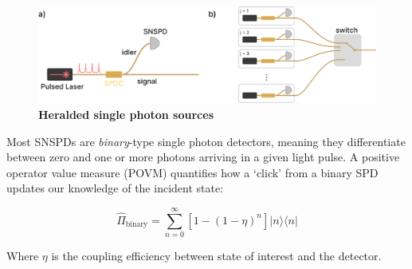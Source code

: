 \documentclass[12pt]{caltech_thesis}
\begin{document}
\hypertarget{fig:hsps}{%
\begin{figure}
\centering
\includegraphics{chapter_05/figs_05/hsps_light.pdf}
\caption[{Heralded single photon source designs}]{\textbf{Heralded
single photon sources}}
\label{fig:hsps}
\end{figure}
}

Most SNSPDs are \emph{binary}-type single photon detectors, meaning they
differentiate between zero and one or more photons arriving in a given
light pulse. A positive operator value measure (POVM) quantifies how a
`click' from a binary SPD updates our knowledge of the incident state:

\[\hat{\Pi}_{\text {binary}} = \sum_{n=0}^{\infty}\left[1-(1-\eta)^{n}\right]|n\rangle\langle n|\]

Where \(\eta\) is the coupling efficiency between state of interest and
the detector.
\end{document}
